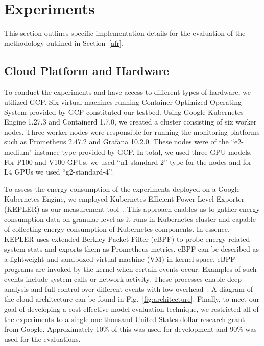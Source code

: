 \documentclass[conference]{IEEEtran}
\begin{document}
\section{Experiments}
\label{experiments}

This section outlines specific implementation details for the evaluation of the methodology outlined in Section~\ref{afr}.


\subsection{Cloud Platform and Hardware}
To conduct the experiments and have access to different types of hardware, we utilized GCP. Six virtual machines running Container Optimized Operating System provided by GCP constituted our testbed. Using Google Kubernetes Engine 1.27.3 and Containerd 1.7.0,  we created a cluster consisting of six worker nodes. Three worker nodes were responsible for running the monitoring platforms such as Prometheus 2.47.2 and Grafana 10.2.0. These nodes were of the ``e2-medium" instance type provided by GCP. In total, we used three GPU models. For P100 and V100 GPUs, we used ``n1-standard-2'' type for the nodes and for L4 GPUs we used ``g2-standard-4''.

To assess the energy consumption of the experiments deployed on a Google Kubernetes Engine, we employed Kubernetes Efficient Power Level Exporter (KEPLER) as our measurement tool~\cite{amaral2023kepler}. This approach enables us to gather energy consumption data on granular level as it runs in Kubernetes cluster and capable of collecting energy consumption of Kubernetes components. In essence, KEPLER uses extended Berkley Packet Filter (eBPF) to probe energy-related system stats and exports them as Prometheus metrics. eBPF can be described as a lightweight and sandboxed virtual machine (VM) in kernel space. eBPF programs are invoked by the kernel when certain events occur. Examples of such events include system calls or network activity. These processes enable deep analysis and full control over different events with low overhead~\cite{sedghpour@ebpf}. A diagram of the cloud architecture can be found in Fig.~\ref{fig:architecture}. Finally, to meet our goal of developing a cost-effective model evaluation technique, we restricted all of the experiments to a single one-thousand United States dollar research grant from Google. Approximately 10\% of this was used for development and 90\% was used for the evaluations.
\end{document}

